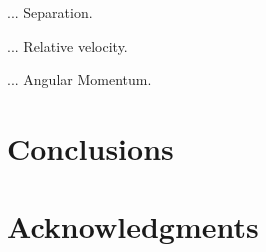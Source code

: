 \documentclass[a4,useAMS,usenatbib,usegraphicx]{latex/mn2e}
\begin{document}
... Separation.

... Relative velocity.

... Angular Momentum.


\section{Conclusions}
\label{sec:conclusions}


\section*{Acknowledgments}  



 




\end{document}
